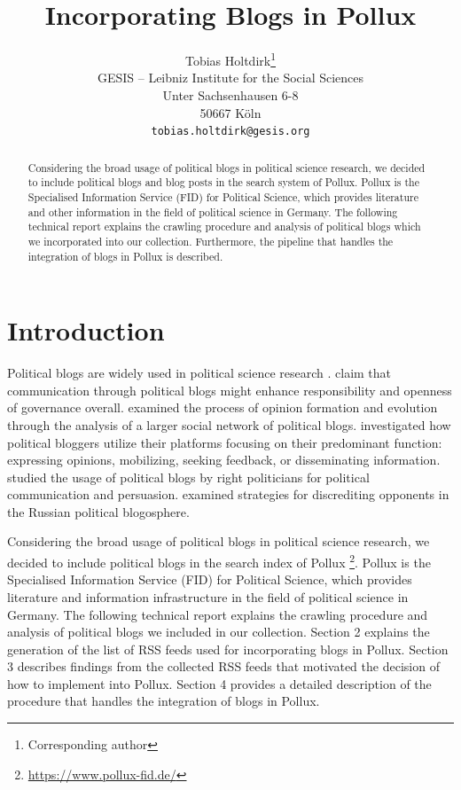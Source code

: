 \documentclass{article}
\title{Incorporating Blogs in Pollux}
\author{ Tobias Holtdirk\thanks{Corresponding author}\\
	GESIS -- Leibniz Institute for the Social Sciences\\
	Unter Sachsenhausen 6-8 \\
    50667 Köln \\
	\texttt{tobias.holtdirk@gesis.org}
}
\begin{document}
\maketitle

\begin{abstract}
	Considering the broad usage of political blogs in political science research, we decided to include political blogs and blog posts in the search system of Pollux. Pollux is the Specialised Information Service (FID) for Political Science, which provides literature and other information in the field of political science in Germany. The following technical report explains the crawling procedure and analysis of political blogs which we incorporated into our collection. Furthermore, the pipeline that handles the integration of blogs in Pollux is described.
\end{abstract}




\section{Introduction}
Political blogs are widely used in political science research \citep{wallsten_agenda_2007, coleman_political_2008, wallsten_political_2008, guner_political_2009, akinnubi_deliberative_2023, peng_role_2023}. \cite{coleman_political_2008} claim that communication through political blogs might enhance responsibility and openness of governance overall. \cite{peng_role_2023} examined the process of opinion formation and evolution through the analysis of a larger social network of political blogs. \cite{wallsten_political_2008} investigated how political bloggers utilize their platforms focusing on their predominant function: expressing opinions, mobilizing, seeking feedback, or disseminating information. \cite{demasi_analysing_2020} studied the usage of political blogs by right politicians for political communication and persuasion. \cite{balakhonskaya_communicative_2020} examined strategies for discrediting opponents in the Russian political blogosphere.

Considering the broad usage of political blogs in political science research, we decided to include political blogs in the search index of Pollux \footnote{\url{https://www.pollux-fid.de/}}. Pollux is the Specialised Information Service (FID) for Political Science, which provides literature and information infrastructure in the field of political science in Germany. The following technical report explains the crawling procedure and analysis of political blogs we included in our collection. Section 2 explains the generation of the list of RSS feeds used for incorporating blogs in Pollux. Section 3 describes findings from the collected RSS feeds that motivated the decision of how to implement into Pollux. Section 4 provides a detailed description of the procedure that handles the integration of blogs in Pollux.
\end{document}
